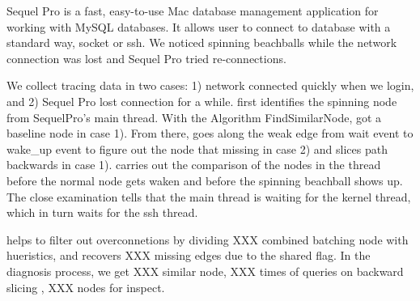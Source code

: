 Sequel Pro is a fast, easy-to-use Mac database management application for
working with MySQL databases. It allows user to connect to database with a
standard way, socket or ssh. We noticed spinning beachballs while the network
connection was lost and Sequel Pro tried re-connections.

We collect tracing data in two cases: 1) network connected quickly when we
login, and 2) Sequel Pro lost connection for a while. \xxx first identifies the
spinning node from SequelPro's main thread.
With the Algorithm FindSimilarNode, \xxx got a baseline node in case 1). From
there, \xxx goes along the weak edge from wait event to wake\_up event to figure
out the node that missing in case 2) and slices path backwards in case 1). \xxx
carries out the comparison of the nodes in the thread before the normal node
gets waken and before the spinning beachball shows up. The close examination
tells that the main thread is waiting for the kernel thread, which in turn waits
for the ssh thread.

\xxx helps to filter out overconnetions by dividing XXX combined batching node
with hueristics, and recovers XXX missing edges due to the shared flag. In the
diagnosis process, we get XXX similar node, XXX times of queries on backward
slicing , XXX nodes for inspect.

